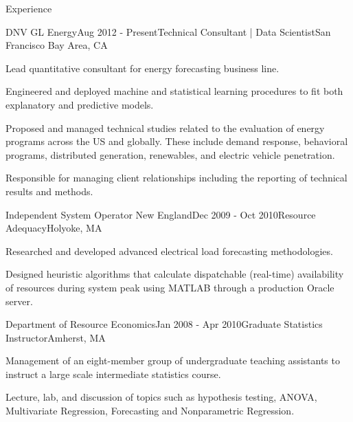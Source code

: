\documentclass{resume} %
\begin{document}

	\begin{rSection}{Experience}

	\begin{rSubsection}{DNV GL Energy}{Aug 2012 - Present}{Technical Consultant | Data Scientist}{San Francisco Bay Area, CA}
	\item Lead quantitative consultant for energy forecasting business line.
	\item Engineered and deployed machine and statistical learning procedures to fit both explanatory and predictive models.
	\item Proposed and managed technical studies related to the evaluation of energy programs across the US and globally. These include demand response, behavioral programs, distributed generation, renewables, and electric vehicle  penetration. 
	\item Responsible for managing client relationships including the reporting of technical results and methods. 
	
	\end{rSubsection}


	\begin{rSubsection}{Independent System Operator New England}{Dec 2009 - Oct 2010}{Resource Adequacy}{Holyoke, MA}
	\item Researched and developed advanced electrical load forecasting methodologies.
	\item Designed heuristic algorithms that calculate dispatchable (real-time) availability of resources during system peak using MATLAB through a production Oracle server.
	\end{rSubsection}


	\begin{rSubsection}{Department of Resource Economics}{Jan 2008 - Apr 2010}{Graduate Statistics Instructor}{Amherst, MA}
	\item Management of an eight-member group of undergraduate teaching assistants to instruct a large scale intermediate statistics course.
  \item Lecture, lab, and discussion of topics such as hypothesis testing, ANOVA, Multivariate Regression, Forecasting and Nonparametric Regression.
	\end{rSubsection}

	\end{rSection}
	
\end{document}
